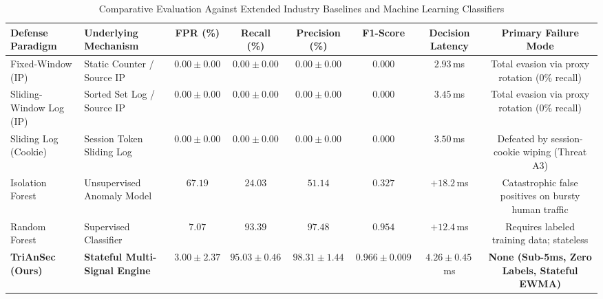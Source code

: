 \begin{table}[htbp]
\centering
\caption{Comparative Evaluation Against Extended Industry Baselines and Machine Learning Classifiers}
\label{tab:extended_baselines}
\renewcommand{\arraystretch}{1.18}
\begin{tabularx}{\textwidth}{@{}lXcccccc@{}}
\hline
\textbf{Defense Paradigm} & \textbf{Underlying Mechanism} & \textbf{FPR (\%)} & \textbf{Recall (\%)} & \textbf{Precision (\%)} & \textbf{F1-Score} & \textbf{Decision Latency} & \textbf{Primary Failure Mode} \\ \hline
Fixed-Window (IP) & Static Counter / Source IP & $0.00 \pm 0.00$ & $0.00 \pm 0.00$ & $0.00 \pm 0.00$ & $0.000$ & $2.93$\,ms & Total evasion via proxy rotation (0\% recall) \\
Sliding-Window Log (IP) & Sorted Set Log / Source IP & $0.00 \pm 0.00$ & $0.00 \pm 0.00$ & $0.00 \pm 0.00$ & $0.000$ & $3.45$\,ms & Total evasion via proxy rotation (0\% recall) \\
Sliding Log (Cookie) & Session Token Sliding Log & $0.00 \pm 0.00$ & $0.00 \pm 0.00$ & $0.00 \pm 0.00$ & $0.000$ & $3.50$\,ms & Defeated by session-cookie wiping (Threat A3) \\
Isolation Forest & Unsupervised Anomaly Model & $67.19$ & $24.03$ & $51.14$ & $0.327$ & $+18.2$\,ms & Catastrophic false positives on bursty human traffic \\
Random Forest & Supervised Classifier & $7.07$ & $93.39$ & $97.48$ & $0.954$ & $+12.4$\,ms & Requires labeled training data; stateless \\ \hline
\textbf{TriAnSec (Ours)} & \textbf{Stateful Multi-Signal Engine} & $\mathbf{3.00 \pm 2.37}$ & $\mathbf{95.03 \pm 0.46}$ & $\mathbf{98.31 \pm 1.44}$ & $\mathbf{0.966 \pm 0.009}$ & $\mathbf{4.26 \pm 0.45}$\,ms & \textbf{None (Sub-5ms, Zero Labels, Stateful EWMA)} \\ \hline
\end{tabularx}
\end{table}
